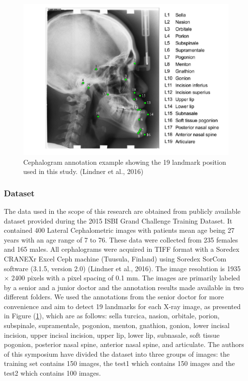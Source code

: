\documentclass{elektr}
\begin{document}

\begin{figure}[H]
	\begin{center}
		\includegraphics[width=5.76in]{./media/image1}
		\caption{Cephalogram annotation example showing the 19 landmark position used in this study.  (Lindner et al., 2016)}
		\label{fig1}
	\end{center}\vs{-4mm}
\end{figure}





\subsubsection{Dataset}
\tab The data used in the scope of this research are obtained from publicly available dataset provided during the 2015 ISBI Grand Challenge Training Dataset. It contained 400 Lateral Cephalometric images with patients mean age being 27 years with an age range of 7 to 76. These data were collected from 235 females and 165 males. All cephalograms were acquired in TIFF format with a Soredex CRANEXr Excel Ceph machine (Tuusula, Finland) using Soredex SorCom software (3.1.5, version 2.0) (Lindner et al., 2016). The image resolution is 1935 $ \times $  2400 pixels with a pixel spacing of 0.1 mm. The images are primarily labeled by a senior and a junior doctor and the annotation results made available in two different folders. We used the annotations from the senior doctor for more convenience and aim to detect 19 landmarks for each X-ray image, as presented in Figure (\ref{fig1}), which are as follows: sella turcica, nasion, orbitale, porion, subspinale, supramentale, pogonion, menton, gnathion, gonion, lower incisal incision, upper incisal incision, upper lip, lower lip, subnasale, soft tissue pogonion, posterior nasal spine, anterior nasal spine, and articulate. The authors of this symposium have divided the dataset into three groups of images: the training set contains 150 images, the test1 which contains 150 images and the test2 which contains 100 images. 
\end{document}
